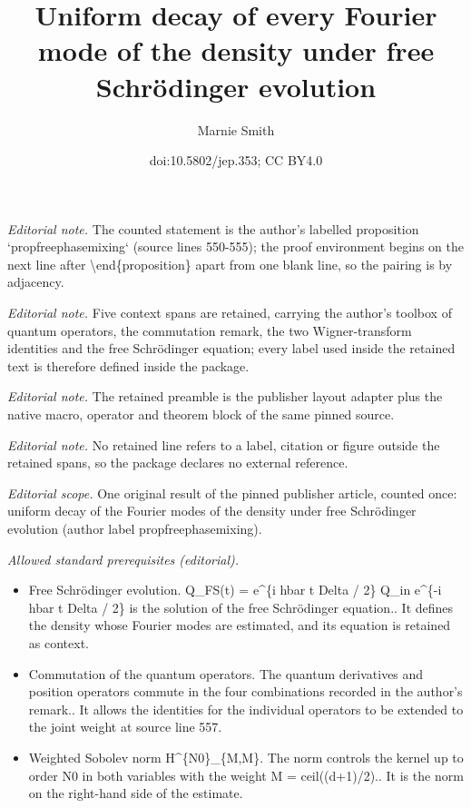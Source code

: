 \documentclass[10pt,a4paper]{article}
\title{Uniform decay of every Fourier mode of the density under free Schrödinger evolution}
\author{Marnie Smith}
\date{doi:10.5802/jep.353; CC BY4.0}
\theoremstyle{plain}
\theoremstyle{remark}
\begin{document}
\maketitle
\noindent\textit{Editorial note.} The counted statement is the author's labelled proposition `propfreephasemixing` (source lines 550-555); the proof environment begins on the next line after \textbackslash{}end\{proposition\} apart from one blank line, so the pairing is by adjacency.\par\medskip
\noindent\textit{Editorial note.} Five context spans are retained, carrying the author's toolbox of quantum operators, the commutation remark, the two Wigner-transform identities and the free Schrödinger equation; every label used inside the retained text is therefore defined inside the package.\par\medskip
\noindent\textit{Editorial note.} The retained preamble is the publisher layout adapter plus the native macro, operator and theorem block of the same pinned source.\par\medskip
\noindent\textit{Editorial note.} No retained line refers to a label, citation or figure outside the retained spans, so the package declares no external reference.\par\medskip
\noindent\textit{Editorial scope.} One original result of the pinned publisher article, counted once: uniform decay of the Fourier modes of the density under free Schrödinger evolution (author label propfreephasemixing).\par\medskip
\noindent\textit{Allowed standard prerequisites (editorial).}\begin{itemize}
\item Free Schrödinger evolution. Q\_FS(t) = e\textasciicircum{}\{i hbar t Delta / 2\} Q\_in e\textasciicircum{}\{-i hbar t Delta / 2\} is the solution of the free Schrödinger equation.. It defines the density whose Fourier modes are estimated, and its equation is retained as context.
\item Commutation of the quantum operators. The quantum derivatives and position operators commute in the four combinations recorded in the author's remark.. It allows the identities for the individual operators to be extended to the joint weight at source line 557.
\item Weighted Sobolev norm H\textasciicircum{}\{N0\}\_\{M,M\}. The norm controls the kernel up to order N0 in both variables with the weight M = ceil((d+1)/2).. It is the norm on the right-hand side of the estimate.
\end{itemize}\medskip
\end{document}

